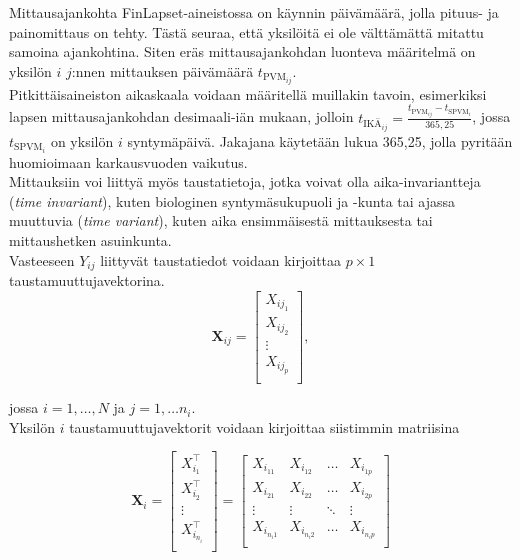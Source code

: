 \documentclass[finnish]{docopts}
\begin{document}
Mittausajankohta FinLapset-aineistossa on käynnin päivämäärä, jolla pituus- ja painomittaus on tehty. Tästä seuraa, että yksilöitä ei ole välttämättä mitattu samoina ajankohtina. Siten eräs mittausajankohdan luonteva määritelmä on yksilön $i$ $j$:nnen mittauksen päivämäärä $t_{\text{PVM}_{ij}}$.\\

Pitkittäisaineiston aikaskaala voidaan määritellä muillakin tavoin, esimerkiksi lapsen mittausajankohdan desimaali-iän mukaan, jolloin $t_{\text{IKÄ}_{ij}} = \frac{t_{\text{PVM}_{ij}} - t_{\text{SPVM}_{i}}}{365,25}$, jossa $t_{\text{SPVM}_{i}}$ on yksilön $i$ syntymäpäivä. Jakajana käytetään lukua 365,25, jolla pyritään huomioimaan karkausvuoden vaikutus.\\ 

Mittauksiin voi liittyä myös taustatietoja, jotka voivat olla aika-invariantteja (\textit{time invariant}), kuten biologinen syntymäsukupuoli ja -kunta tai ajassa muuttuvia (\textit{time variant}), kuten aika ensimmäisestä mittauksesta tai mittaushetken asuinkunta.\\

Vasteeseen $Y_{ij}$ liittyvät taustatiedot voidaan kirjoittaa $p \times 1$ taustamuuttujavektorina. \\

$$
\bm{X}_{ij} = 
\begin{bmatrix}
X_{ij_{1}} \\
X_{ij_{2}} \\
\vdots \\
X_{ij_{p}} \\
\end{bmatrix},
$$

jossa $i = 1, \dots, N$ ja $j = 1, \dots n_i$. \\ 

Yksilön $i$ taustamuuttujavektorit voidaan kirjoittaa siistimmin matriisina

$$
\bm{X}_{i} = 
\begin{bmatrix}
X_{i_{1}}^\top \\
X_{i_{2}}^\top  \\
\vdots \\
X_{i_{n_i}}^\top  \\
\end{bmatrix}
=
\begin{bmatrix}
X_{i_{11}} & X_{i_{12}} & \dots & X_{i_{1p}} \\
X_{i_{21}} & X_{i_{22}} & \dots & X_{i_{2p}} \\
\vdots & \vdots & \ddots & \vdots \\
X_{i_{n_i1}} & X_{i_{n_i2}} & \dots & X_{i_{n_ip}} \\
\end{bmatrix}
$$\\
\end{document}
